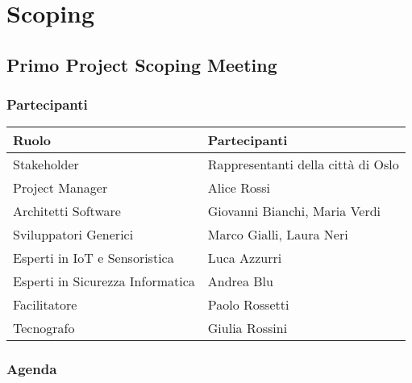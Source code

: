 \chapter{Scoping}

\section{Primo Project Scoping Meeting}

\subsection{Partecipanti}


\begin{center}
    \begin{tabular}{|l|l|}
        \hline
        \textbf{Ruolo}                   & \textbf{Partecipanti}              \\
        \hline
        Stakeholder                      & Rappresentanti della città di Oslo \\
        \hline
        Project Manager                  & Alice Rossi                        \\
        \hline
        Architetti Software              & Giovanni Bianchi, Maria Verdi      \\
        \hline
        Sviluppatori Generici            & Marco Gialli, Laura Neri           \\
        \hline
        Esperti in IoT e Sensoristica    & Luca Azzurri                       \\
        \hline
        Esperti in Sicurezza Informatica & Andrea Blu                         \\
        \hline
        Facilitatore                     & Paolo Rossetti                     \\
        \hline
        Tecnografo                       & Giulia Rossini                     \\
        \hline
    \end{tabular}
\end{center}

\subsection{Agenda}

